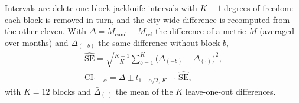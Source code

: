 \documentclass[pdflatex,sn-basic]{sn-jnl}
\begin{document}
Intervals are delete-one-block jackknife intervals with $K - 1$ degrees of freedom: each block is removed in turn, and the city-wide difference is recomputed from the other eleven. With $\Delta = M_{\mathrm{cand}} - M_{\mathrm{ref}}$ the difference of a metric $M$ (averaged over months) and $\Delta_{(-b)}$ the same difference without block $b$,
\begin{equation}
\begin{gathered}
\widehat{\mathrm{SE}} = \sqrt{\frac{K-1}{K} \sum_{b=1}^{K} \big(\Delta_{(-b)} - \bar{\Delta}_{(\cdot)}\big)^2}, \\
\mathrm{CI}_{1-\alpha} = \Delta \pm t_{1-\alpha/2,\,K-1}\, \widehat{\mathrm{SE}}, 
\end{gathered} \label{eq:jackknife}
\end{equation}
with $K = 12$ blocks and $\bar{\Delta}_{(\cdot)}$ the mean of the $K$ leave-one-out differences.
\end{document}
